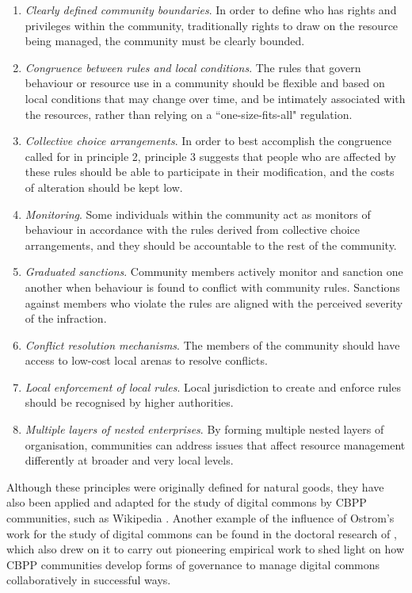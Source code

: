 \begin{enumerate}
	\item \textit{Clearly defined community boundaries}. In order to define who has rights and privileges within the community, traditionally rights to draw on the resource being managed, the community must be clearly bounded. 
	\item \textit{Congruence  between  rules  and  local  conditions}. The rules  that govern behaviour or resource use in a community should be flexible and based on local conditions that may change over time, and be intimately associated with the resources, rather than relying on a ``one-size-fits-all" regulation.
	\item \textit{Collective choice arrangements}. In order to best accomplish the congruence called for in principle 2, principle 3 suggests that people who are affected by these rules should be able to participate in their modification, and the costs of alteration should be kept low.
	\item \textit{Monitoring}. Some individuals within the community act as monitors  of  behaviour  in  accordance  with  the  rules  derived  from  collective  choice arrangements, and they should be accountable to the rest of the community.
	\item \textit{Graduated sanctions}. Community members actively monitor and sanction one another when behaviour is found to conflict with community rules. Sanctions against members who violate the rules are aligned with the perceived severity of the infraction.
	\item \textit{Conflict resolution mechanisms}. The members of the community should have access to low-cost local arenas to resolve conflicts.
	\item \textit{Local enforcement of local rules}. Local jurisdiction to create and enforce rules should be recognised by higher authorities.
	\item \textit{Multiple layers of nested enterprises}. By forming multiple nested layers  of organisation,  communities  can  address  issues  that  affect  resource management differently at broader and very local levels.	
\end{enumerate}

Although these principles were originally defined for natural goods, they have also been applied and adapted for the study of digital commons by CBPP communities, such as Wikipedia \parencite{viegas2007hidden, forte2009decentralization}. Another example of the influence of Ostrom's work for the study of digital commons can be found in the doctoral research of \textcite{fuster2010governance}, which also drew on it to carry out pioneering empirical work to shed light on how CBPP communities develop forms of governance to manage digital commons collaboratively in successful ways.

